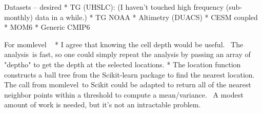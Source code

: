 Datasets -- desired
            * TG (UHSLC): (I haven’t touched high frequency (sub-monthly) data in a while.)
            * TG NOAA
            * Altimetry (DUACS)
            * CESM coupled
            * MOM6
            * Generic CMIP6

For momlevel
 
* I agree that knowing the cell depth would be useful.  The analysis is fast, so one could simply repeat the analysis by passing an array of "deptho" to get the depth at the selected locations.
* The location function constructs a ball tree from the Scikit-learn package to find the nearest location.  The call from momlevel to Scikit could be adapted to return all of the nearest neighbor points within a threshold to compute a mean/variance.  A modest amount of work is needed, but it's not an intractable problem.